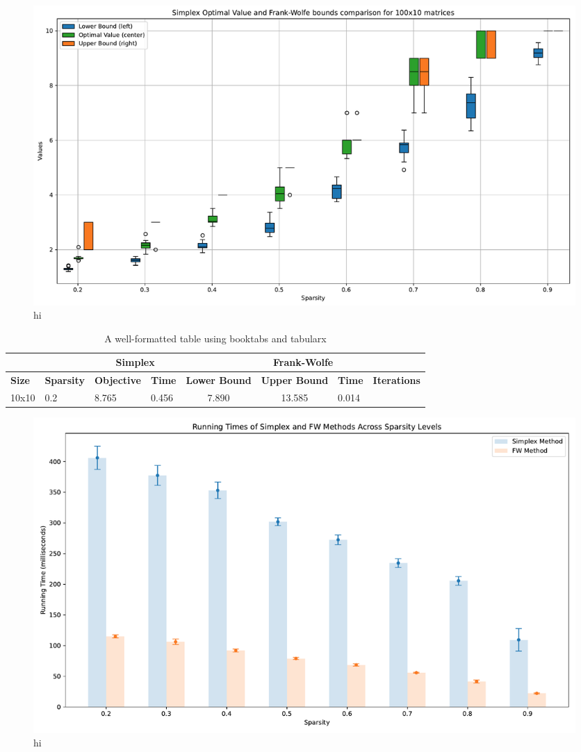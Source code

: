 \begin{landscape}
\begin{figure}[b]
    \centering
    \includegraphics[scale=0.7]{assets/figures/firstactualtest.pdf}
    \caption{hi}
\end{figure}
\end{landscape}

\newpage


\begin{landscape}
\begin{table}[h]
    \centering
    \begin{tabularx}{1.35\textwidth}{XXXXccXX}
        \toprule
        && \multicolumn{2}{c}{\textbf{Simplex}} & \multicolumn{4}{c}{\textbf{Frank-Wolfe}}\\ \midrule
        \textbf{Size} & \textbf{Sparsity} & \textbf{Objective} & \textbf{Time} &
        \textbf{Lower Bound} & \textbf{Upper Bound} & \textbf{Time} & \textbf{Iterations} \\ \midrule
        10x10 & 0.2 & 8.765 & 0.456 & 7.890 & 13.585 & 0.014 \\
        \bottomrule
    \end{tabularx}
    \caption{A well-formatted table using booktabs and tabularx}
    \label{table:booktabs}
\end{table}

\end{landscape}

\newpage
\begin{landscape}
\begin{figure}[b]
    \centering
    \includegraphics[scale=0.75]{assets/figures/barplot.pdf}
    \caption{hi}
\end{figure}
\end{landscape}

